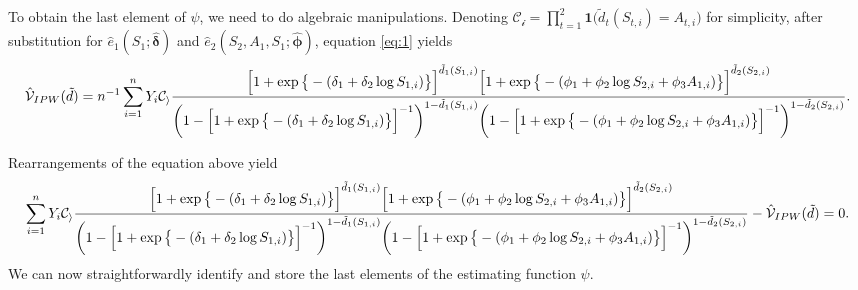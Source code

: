 \documentclass[
]{article}
\begin{document}
To obtain the last element of \(\psi\), we need to do algebraic
manipulations. Denoting
\(\mathcal{C_i}=\prod_{t=1}^2\mathbf{1}\big({\tilde{d}_t(S_{t,i})=A_{t,i}}\big)\)
for simplicity, after substitution for
\(\hat{e}_1(S_1;\boldsymbol{\hat{\delta}})\) and
\(\hat{e}_2(S_2,A_1,S_1;\boldsymbol{\hat{\phi}})\), equation \ref{eq:1}
yields \begin{equation}
\hat{\mathcal{V}}_{IPW}(\tilde{d})=\\
n^{-1}\sum_{i=1}^nY_i\mathcal{C_i} 
\frac{\Big[1+\exp\big\{-(\delta_1+\delta_2 \log S_{1,i})\big\}\Big]^{\tilde{d}_1(S_{1,i})} \Big[1+\exp\big\{-(\phi_1+\phi_2 \log S_{2,i}+\phi_3 A_{1,i})\big\}\Big]^{\tilde{d}_2(S_{2,i})}}
{\bigg(1-\Big[1+\exp\big\{-(\delta_1+\delta_2 \log S_{1,i})\big\}\Big]^{-1}\bigg)^{1-\tilde{d}_1(S_{1,i})}\bigg(1-\Big[1+\exp\big\{-(\phi_1+\phi_2 \log S_{2,i}+\phi_3 A_{1,i})\big\}\Big]^{-1}\bigg)^{1-\tilde{d}_2(S_{2,i})}}.
\end{equation}

Rearrangements of the equation above yield \begin{equation}
\sum_{i=1}^nY_i\mathcal{C_i}
\frac{\Big[1+\exp\big\{-(\delta_1+\delta_2 \log S_{1,i})\big\}\Big]^{\tilde{d}_1(S_{1,i})} \Big[1+\exp\big\{-(\phi_1+\phi_2 \log S_{2,i}+\phi_3 A_{1,i})\big\}\Big]^{\tilde{d}_2(S_{2,i})}}
{\bigg(1-\Big[1+\exp\big\{-(\delta_1+\delta_2 \log S_{1,i})\big\}\Big]^{-1}\bigg)^{1-\tilde{d}_1(S_{1,i})}\bigg(1-\Big[1+\exp\big\{-(\phi_1+\phi_2 \log S_{2,i}+\phi_3 A_{1,i})\big\}\Big]^{-1}\bigg)^{1-\tilde{d}_2(S_{2,i})}} \\
-\hat{\mathcal{V}}_{IPW}(\tilde{d})=0.
\end{equation} We can now straightforwardly identify and store the last
elements of the estimating function \(\psi\).
\end{document}
